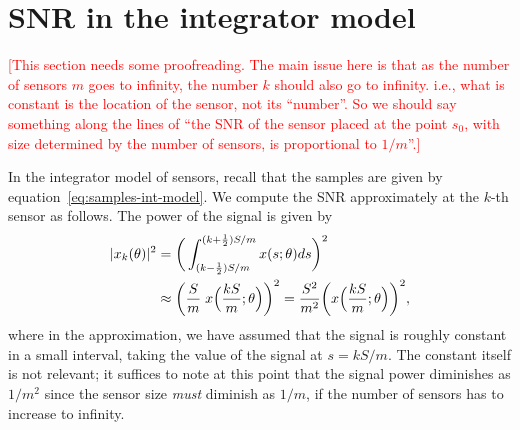 \documentclass[conference,letterpaper]{IEEEtran}
\DeclarePairedDelimiter\abs{\lvert}{\rvert}
\begin{document}





\appendices

\section{SNR in the integrator model}
\label{app:integrator-snr}

\textcolor{red}{[This section needs some proofreading. The main issue here is
	that as the number of sensors $m$ goes to infinity, the number $k$ should
	also go to infinity. i.e., what is constant is the location of the sensor,
	not its ``number''. So we should say something along the lines of ``the SNR
	of the sensor placed at the point $s_0$, with size determined by the number
	of sensors, is proportional to $1/m$''.]}

In the integrator model of sensors, recall that the samples are given by
equation~\eqref{eq:samples-int-model}. We compute the SNR approximately at the
$k$-th sensor as follows. The power of the signal is given by
\begin{align}
	\abs{x_k(\theta)}^2 &= \bigg(\int_{(k-\frac{1}{2})S/m}^{(k+\frac{1}{2})S/m} x(s;\theta) ds\bigg)^2 \\
	&\approx \bigg(\frac{S}{m} \; x\Big(\frac{kS}{m}; \theta\Big)\bigg)^2 = \frac{S^2}{m^2} \bigg(x\Big(\frac{kS}{m}; \theta\Big)\bigg)^2 \label{eq:signal-power-k},
\end{align}
where in the approximation, we have assumed that the signal is roughly constant
in a small interval, taking the value of the signal at $s = kS/m$. The constant
itself is not relevant; it suffices to note at this point that the signal power
diminishes as $1/m^2$ since the sensor size \emph{must} diminish as $1/m$, if
the number of sensors has to increase to infinity.
\end{document}
